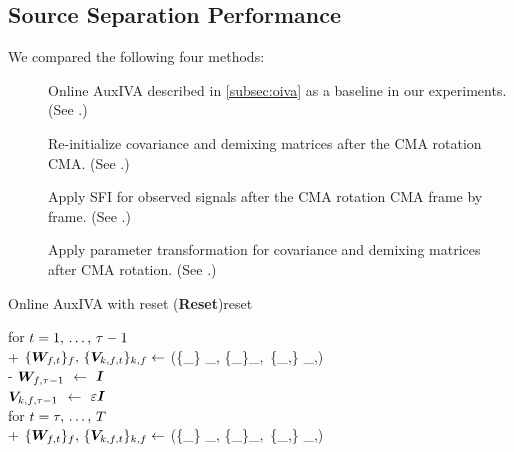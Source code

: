 \documentclass[sip,biber]{now-journal}
\begin{document}
\subsection{Source Separation Performance}

We compared the following four methods:
\begin{description}
  \item[\NaiveIVA] Online AuxIVA described in \cref{subsec:oiva} as a baseline in our experiments. (See .)
  \item[\ResetIVA] Re-initialize covariance and demixing matrices after the CMA rotation CMA. (See .)
  \item[\SFIIVAo] Apply SFI for observed signals after the CMA rotation CMA frame by frame. (See .)
  \item[\SFIIVAm] Apply parameter transformation for covariance and demixing matrices after CMA rotation.  (See .)
\end{description}
\begin{algorithm}{Online AuxIVA with reset (\textbf{Reset})}{reset}
  \begin{pseudo}
    for $t = 1,\, \dots,\, \tau - 1$ \\+
      $\{\Demix _{\ft}\}_{\freq},\, \{\cov _{\src,\ft}\} _{\src,\freq} \gets$ (\{\Obs _{\ft}\} _{\freq}, \{\Demix _{\ft[-1]}\}_{\freq},\, \{\cov _{\src,\ft[-1]}\} _{\src,\freq}) \\-
    {$\bm{W} _{f,\tau - 1}$} $\gets$ $\bm{I}$ \ct{$(\forall \freq)$} \\
    {$\bm{V} _{k,f,\tau - 1}$} $\gets$ $\varepsilon \bm{I}$ \ct{$(\forall \src,\freq)$} \\
    for $t = \tau,\, \dots,\, T$ \\+
      $\{\Demix _{\ft}\}_{\freq},\, \{\cov _{\src,\ft}\} _{\src,\freq} \gets$ (\{\Obs _{\ft}\} _{\freq}, \{\Demix _{\ft[-1]}\}_{\freq},\, \{\cov _{\src,\ft[-1]}\} _{\src,\freq})
  \end{pseudo}
\end{algorithm}
\end{document}
